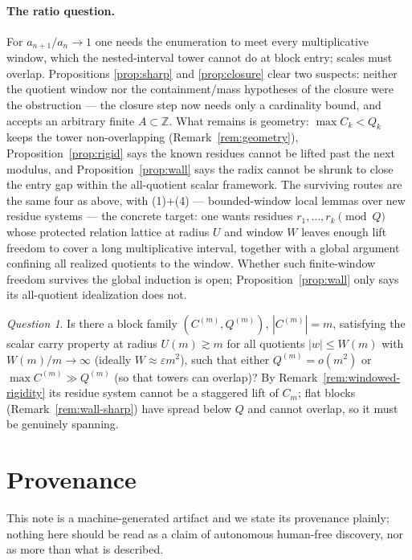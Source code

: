 \documentclass[11pt]{article}
\theoremstyle{definition}
\theoremstyle{remark}
\newtheorem{question}[lemma]{Question}
\newcommand{\Z}{\mathbb{Z}}
\begin{document}
\paragraph{The ratio question.} For $a_{n+1}/a_n\to1$ one needs the
enumeration to meet every multiplicative window, which the
nested-interval tower cannot do at block entry; scales must overlap.
Propositions \ref{prop:sharp} and \ref{prop:closure} clear two suspects:
neither the quotient window nor the containment/mass hypotheses of the
closure were the obstruction --- the closure step now needs only a
cardinality bound, and accepts an arbitrary finite $A\subset\Z$. What
remains is geometry: $\max C_k<Q_k$ keeps the tower non-overlapping
(Remark~\ref{rem:geometry}), Proposition~\ref{prop:rigid} says the known
residues cannot be lifted past the next modulus, and
Proposition~\ref{prop:wall} says the radix cannot be shrunk to close the
entry gap within the all-quotient scalar framework. The surviving routes
are the same four as above, with (1)+(4) --- bounded-window local lemmas
over new residue systems --- the concrete target: one wants residues
$r_1,\dots,r_k\pmod Q$ whose protected relation lattice at radius $U$ and
window $W$ leaves enough lift freedom to cover a long multiplicative
interval, together with a global argument confining all realized
quotients to the window. Whether such finite-window freedom survives the
global induction is open; Proposition~\ref{prop:wall} only says its
all-quotient idealization does not.

\begin{question}
Is there a block family $(C^{(m)},Q^{(m)})$, $|C^{(m)}|=m$, satisfying
the scalar carry property at radius $U(m)\gtrsim m$ for all quotients
$|w|\le W(m)$ with $W(m)/m\to\infty$ (ideally $W\approx\varepsilon m^2$),
such that either $Q^{(m)}=o(m^2)$ or $\max C^{(m)}\gg Q^{(m)}$ (so that
towers can overlap)? By Remark~\ref{rem:windowed-rigidity} its residue
system cannot be a staggered lift of $C_m$; flat blocks
(Remark~\ref{rem:wall-sharp}) have spread below $Q$ and cannot overlap,
so it must be genuinely spanning.
\end{question}

\section{Provenance}\label{sec:provenance}

This note is a machine-generated artifact and we state its provenance
plainly; nothing here should be read as a claim of autonomous human-free
discovery, nor as more than what is described.
\end{document}
